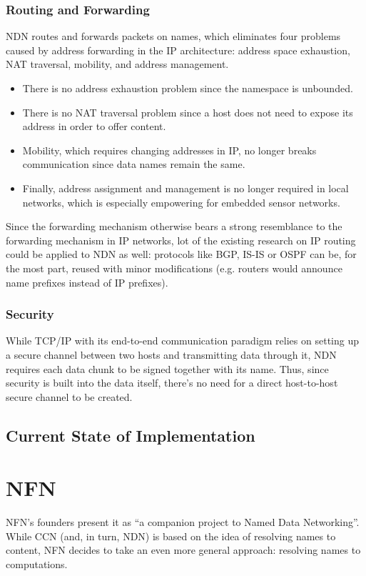             \subsubsection{Routing and Forwarding}
                NDN routes and forwards packets on names, which eliminates four problems caused by address forwarding in the IP architecture: address space exhaustion, NAT traversal, mobility, and address management.
                \begin{itemize}
                    \item There is no address exhaustion problem since the namespace is unbounded.
                    \item There is no NAT traversal problem since a host does not need to expose its address in order to offer content.
                    \item Mobility, which requires changing addresses in IP, no longer breaks communication since data names remain the same.
                    \item Finally, address assignment and management is no longer required in local networks, which is especially empowering for embedded sensor networks.
                \end{itemize}

                Since the forwarding mechanism otherwise bears a strong resemblance to the forwarding mechanism in IP networks, lot of the existing research on IP routing could be applied to NDN as well: protocols like BGP, IS-IS or OSPF can be, for the most part, reused with minor modifications (e.g. routers would announce name prefixes instead of IP prefixes).

            \subsubsection{Security}
                While TCP/IP with its end-to-end communication paradigm relies on setting up a secure channel between two hosts and transmitting data through it, NDN requires each data chunk to be signed together with its name. Thus, since security is built into the data itself, there's no need for a direct host-to-host secure channel to be created.

        \subsection{Current State of Implementation}

    \section{NFN}
        NFN's founders present it as ``a companion project to Named Data Networking''. While CCN (and, in turn, NDN) is based on the idea of resolving names to content, NFN decides to take an even more general approach: resolving names to computations.


